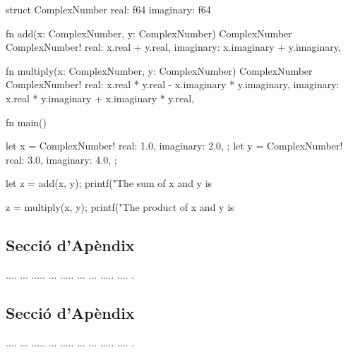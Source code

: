 ﻿\documentclass[10pt,a4paper,twocolumn,twoside]{article}
\begin{document}
\begin{code}
struct ComplexNumber {
    real:      f64
    imaginary: f64
}

fn add(x: ComplexNumber, y: ComplexNumber) ComplexNumber {
    ComplexNumber!{
        real: x.real + y.real,
        imaginary: x.imaginary + y.imaginary,
    }
}

fn multiply(x: ComplexNumber, y: ComplexNumber) ComplexNumber {
    ComplexNumber!{
        real: x.real * y.real - x.imaginary * y.imaginary,
        imaginary: x.real * y.imaginary + x.imaginary * y.real,
    }
}

fn main() {
    let x = ComplexNumber!{
        real: 1.0,
        imaginary: 2.0,
    };
    let y = ComplexNumber!{
        real: 3.0,
        imaginary: 4.0,
    };

    let z = add(x, y);
    printf("The sum of x and y is %

    z = multiply(x, y);
    printf("The product of x and y is %
}
\end{code}

\setcounter{section}{1}

\subsection{Secció d'Apèndix}
.... ... ..... ... ..... ... ... ..... .... .

\subsection{Secció d'Apèndix}
.... ... ..... ... ..... ... ... ..... .... .
\end{document}
